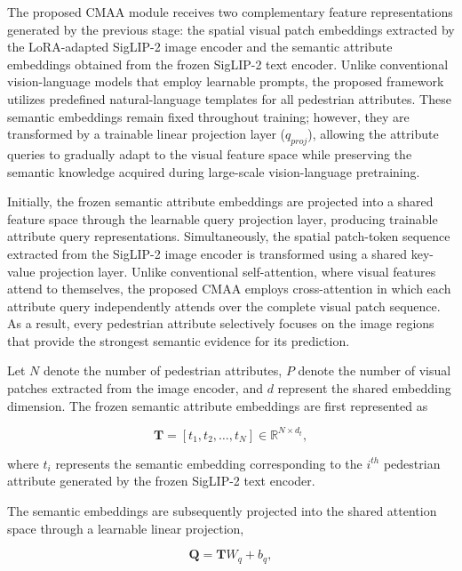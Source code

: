 \documentclass{ieeeaccess}
\begin{document}
The proposed CMAA module receives two complementary feature representations generated by the previous stage: the spatial visual patch embeddings extracted by the LoRA-adapted SigLIP-2 image encoder and the semantic attribute embeddings obtained from the frozen SigLIP-2 text encoder. Unlike conventional vision-language models that employ learnable prompts, the proposed framework utilizes predefined natural-language templates for all pedestrian attributes. These semantic embeddings remain fixed throughout training; however, they are transformed by a trainable linear projection layer ($q_{proj}$), allowing the attribute queries to gradually adapt to the visual feature space while preserving the semantic knowledge acquired during large-scale vision-language pretraining.

Initially, the frozen semantic attribute embeddings are projected into a shared feature space through the learnable query projection layer, producing trainable attribute query representations. Simultaneously, the spatial patch-token sequence extracted from the SigLIP-2 image encoder is transformed using a shared key-value projection layer. Unlike conventional self-attention, where visual features attend to themselves, the proposed CMAA employs cross-attention in which each attribute query independently attends over the complete visual patch sequence. As a result, every pedestrian attribute selectively focuses on the image regions that provide the strongest semantic evidence for its prediction.

Let $N$ denote the number of pedestrian attributes, $P$ denote the number of visual patches extracted from the image encoder, and $d$ represent the shared embedding dimension. The frozen semantic attribute embeddings are first represented as

\begin{equation}
\mathbf{T}
=
\left[
t_1,t_2,\ldots,t_N
\right]
\in
\mathbb{R}^{N\times d_t},
\label{eq:text_embedding}
\end{equation}

where $t_i$ represents the semantic embedding corresponding to the $i^{th}$ pedestrian attribute generated by the frozen SigLIP-2 text encoder.

The semantic embeddings are subsequently projected into the shared attention space through a learnable linear projection,

\begin{equation}
\mathbf{Q}
=
\mathbf{T}W_q+b_q,
\label{eq:query_projection}
\end{equation}
\end{document}
